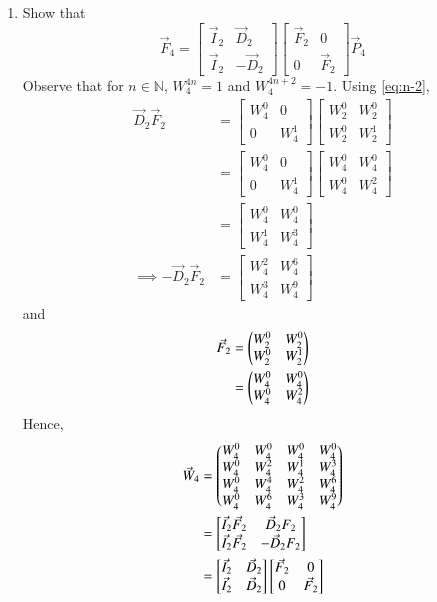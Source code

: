 \documentclass[journal,12pt,twocolumn]{IEEEtran}
\renewcommand\thesection{\arabic{section}}
\newcommand{\mybvec}[1]{\ensuremath{\begin{bmatrix}#1\end{bmatrix}}}
\newcommand{\w}[2]{\ensuremath{W_{#1}^{#2}}}
\begin{document}
\begin{enumerate}[label=\thesection.\arabic*]
\item Show that 
\begin{equation}
	\vec{F}_{4}=
	\begin{bmatrix}
		\vec{I}_{2} & \vec{D}_{2} \\
		\vec{I}_{2} & -\vec{D}_{2}
	\end{bmatrix}
	\begin{bmatrix}
		\vec{F}_{2} & 0 \\
		0 & \vec{F}_{2}
	\end{bmatrix}
	\vec{P}_{4}
	\label{eq:fft-recurrence}
\end{equation}
\solution Observe that for $n \in \mathbb{N}$, $W_4^{4n} = 1$ and $W_4^{4n + 2} = -1$. Using \eqref{eq:n-2},
\begin{align}
	\vec{D}_2\vec{F}_2 &= \mybvec{\w{4}{0} & 0 \\ 0 & \w{4}{1}}\mybvec{\w{2}{0} & \w{2}{0} \\ \w{2}{0} & \w{2}{1}} \\
	&= \mybvec{\w{4}{0} & 0 \\ 0 & \w{4}{1}}\mybvec{\w{4}{0} & \w{4}{0} \\ \w{4}{0} & \w{4}{2}} \\
	&= \mybvec{\w{4}{0} & \w{4}{0} \\ \w{4}{1} & \w{4}{3}} \label{eq:fft-df1} \\
	\implies -\vec{D}_2\vec{F}_2 &= \mybvec{\w{4}{2} & \w{4}{6} \\ \w{4}{3} & \w{4}{9}} \label{eq:fft-df2}
\end{align}
and
\begin{align}
	\vec{F}_2 &= \myvec{\w{2}{0} & \w{2}{0} \\ \w{2}{0} & \w{2}{1}} \\
	&= \myvec{\w{4}{0} & \w{4}{0} \\ \w{4}{0} & \w{4}{2}}
\end{align}
Hence,
\begin{align}
	\vec{W}_4 &= \myvec{\w{4}{0} & \w{4}{0} & \w{4}{0} & \w{4}{0} \\
		\w{4}{0} & \w{4}{2} & \w{4}{1} & \w{4}{3} \\
		\w{4}{0} & \w{4}{4} & \w{4}{2} & \w{4}{6} \\
		\w{4}{0} & \w{4}{6} & \w{4}{3} & \w{4}{9} 
	} \label{eq:fft-permutation} \\
	&= \mybvec{\vec{I}_2\vec{F}_2 & \vec{D}_2{F}_2 \\ \vec{I}_2\vec{F}_2 & -\vec{D}_2{F}_2} \\
	&= \mybvec{\vec{I}_2 & \vec{D}_2 \\ \vec{I}_2 & \vec{D}_2}\mybvec{\vec{F}_2 & 0 \\ 0 & \vec{F}_2}

\end{align}
\end{enumerate}
\end{document}
